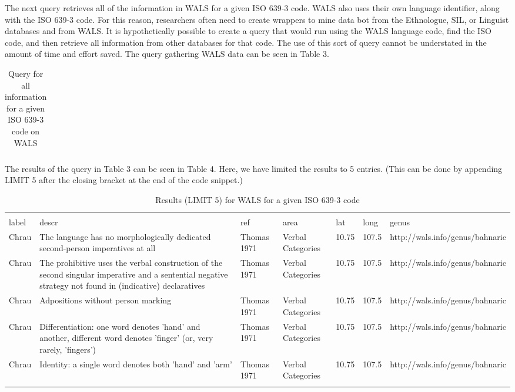 
The next query retrieves all of the information in WALS for a given ISO 639-3 code. WALS also uses their own language identifier, along with the ISO 639-3 code. For this reason, researchers often need to create wrappers to mine data bot from the Ethnologue, SIL, or Linguist databases and from WALS. It is hypothetically possible to create a query that would run using the WALS language code, find the ISO code, and then retrieve all information from other databases for that code. The use of this sort of query cannot be understated in the amount of time and effort saved. The query gathering WALS data can be seen in Table 3. 

\begin{table*}
\caption{Query for all information for a given ISO 639-3 code on WALS} \label{t1}
\begin{tabular}{lll}
\hline
{\footnotesize } \\
\hline
\end{tabular}
\end{table*}

The results of the query in Table 3 can be seen in Table 4. Here, we have limited the results to 5 entries. (This can be done by appending LIMIT 5 after the closing bracket at the end of the code snippet.) 


\begin{table*}
\caption{Results (LIMIT 5) for WALS for a given ISO 639-3 code} \label{t1}
\begin{tabular}{p{.5cm}p{4cm}p{2cm}p{2cm}p{.5cm}p{.5cm}p{3.5cm}}
\hline
& & & & & & \\
label & descr &ref & area & lat & long &genus \\
Chrau & The language has no morphologically dedicated second-person imperatives at all&Thomas 1971 & Verbal Categories&10.75&107.5&http://wals.info/genus/bahnaric\\
Chrau &The prohibitive uses the verbal construction of the second singular imperative and a sentential negative strategy not found in (indicative) declaratives&Thomas 1971&Verbal Categories&10.75&107.5&http://wals.info/genus/bahnaric \\
Chrau&Adpositions without person marking&Thomas 1971&Verbal Categories&10.75&107.5&http://wals.info/genus/bahnaric \\
Chrau&Differentiation: one word denotes 'hand' and another, different word denotes 'finger' (or, very rarely, 'fingers')&Thomas 1971&Verbal Categories&10.75&107.5&http://wals.info/genus/bahnaric \\
Chrau&Identity: a single word denotes both 'hand' and 'arm'&Thomas 1971&Verbal Categories&10.75&107.5&http://wals.info/genus/bahnaric \\
& & & & & & \\
\hline
\end{tabular}
\end{table*}



